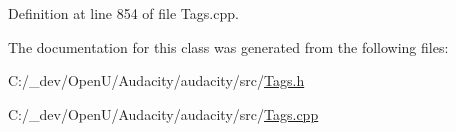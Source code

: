 Definition at line 854 of file Tags.\+cpp.



The documentation for this class was generated from the following files\+:\begin{DoxyCompactItemize}
\item 
C\+:/\+\_\+dev/\+Open\+U/\+Audacity/audacity/src/\hyperlink{src_2tags_8h}{Tags.\+h}\item 
C\+:/\+\_\+dev/\+Open\+U/\+Audacity/audacity/src/\hyperlink{_tags_8cpp}{Tags.\+cpp}\end{DoxyCompactItemize}
